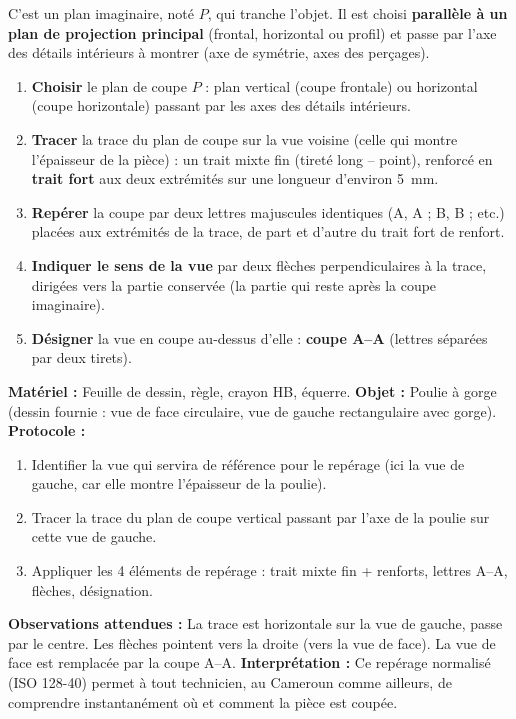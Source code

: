 \documentclass[11pt]{article}
\newcommand{\cle}[1]{{\popxbold\color{popdark}#1}}
\newcounter{popsec}
\newcounter{popsub}
\newcommand{\courssub}[1]{%
  \stepcounter{popsub}%
  \par\vspace{9pt}\noindent{\popxbold\fontsize{11.5}{13}\selectfont\color{popink}{\color{poporange}\thepopsec.\thepopsub}\hspace{6pt}#1}\par\nopagebreak\vspace{4pt}
}
\begin{document}
\courssub{Le plan de coupe et son repérage}

\begin{definition}
C'est un plan imaginaire, noté $P$, qui tranche l'objet. Il est choisi \textbf{parallèle à un plan de projection principal} (frontal, horizontal ou profil) et passe par l'axe des détails intérieurs à montrer (axe de symétrie, axes des perçages).
\end{definition}

\begin{methode}
\begin{enumerate}
\item \textbf{Choisir} le plan de coupe $P$ : plan vertical (coupe frontale) ou horizontal (coupe horizontale) passant par les axes des détails intérieurs.
\item \textbf{Tracer} la trace du plan de coupe sur la vue voisine (celle qui montre l'épaisseur de la pièce) : un \cle{trait mixte fin} (tireté long -- point), renforcé en \textbf{trait fort} aux deux extrémités sur une longueur d'environ \SI{5}{mm}.
\item \textbf{Repérer} la coupe par deux lettres majuscules identiques (A, A ; B, B ; etc.) placées aux extrémités de la trace, de part et d'autre du trait fort de renfort.
\item \textbf{Indiquer le sens de la vue} par deux flèches perpendiculaires à la trace, dirigées vers la partie conservée (la partie qui reste après la coupe imaginaire).
\item \textbf{Désigner} la vue en coupe au-dessus d'elle : \og \textbf{coupe A--A} \fg (lettres séparées par deux tirets).
\end{enumerate}
\end{methode}

\begin{experience}
\textbf{Matériel :} Feuille de dessin, règle, crayon HB, équerre. \textbf{Objet :} Poulie à gorge (dessin fournie : vue de face circulaire, vue de gauche rectangulaire avec gorge).
\textbf{Protocole :}
\begin{enumerate}
\item Identifier la vue qui servira de référence pour le repérage (ici la vue de gauche, car elle montre l'épaisseur de la poulie).
\item Tracer la trace du plan de coupe vertical passant par l'axe de la poulie sur cette vue de gauche.
\item Appliquer les 4 éléments de repérage : trait mixte fin + renforts, lettres A--A, flèches, désignation.
\end{enumerate}
\textbf{Observations attendues :} La trace est horizontale sur la vue de gauche, passe par le centre. Les flèches pointent vers la droite (vers la vue de face). La vue de face est remplacée par la coupe A--A.
\textbf{Interprétation :} Ce repérage normalisé (ISO 128-40) permet à tout technicien, au Cameroun comme ailleurs, de comprendre instantanément où et comment la pièce est coupée.
\end{experience}
\end{document}
